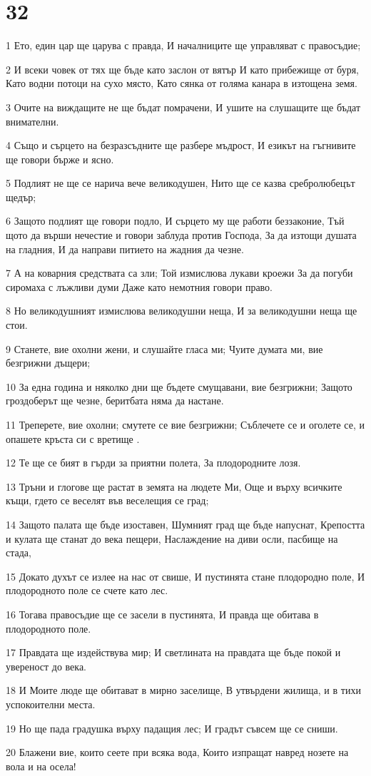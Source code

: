 \chapter{32}

\par 1 Ето, един цар ще царува с правда, И началниците ще управляват с правосъдие;
\par 2 И всеки човек от тях ще бъде като заслон от вятър И като прибежище от буря, Като водни потоци на сухо място, Като сянка от голяма канара в изтощена земя.
\par 3 Очите на виждащите не ще бъдат помрачени, И ушите на слушащите ще бъдат внимателни.
\par 4 Също и сърцето на безразсъдните ще разбере мъдрост, И езикът на гъгнивите ще говори бърже и ясно.
\par 5 Подлият не ще се нарича вече великодушен, Нито ще се казва сребролюбецът щедър;
\par 6 Защото подлият ще говори подло, И сърцето му ще работи беззаконие, Тъй щото да върши нечестие и говори заблуда против Господа, За да изтощи душата на гладния, И да направи питието на жадния да чезне.
\par 7 А на коварния средствата са зли; Той измислюва лукави кроежи За да погуби сиромаха с лъжливи думи Даже като немотния говори право.
\par 8 Но великодушният измислюва великодушни неща, И за великодушни неща ще стои.
\par 9 Станете, вие охолни жени, и слушайте гласа ми; Чуите думата ми, вие безгрижни дъщери;
\par 10 За една година и няколко дни ще бъдете смущавани, вие безгрижни; Защото гроздоберът ще чезне, беритбата няма да настане.
\par 11 Треперете, вие охолни; смутете се вие безгрижни; Съблечете се и оголете се, и опашете кръста си с вретище .
\par 12 Те ще се бият в гърди за приятни полета, За плодородните лозя.
\par 13 Тръни и глогове ще растат в земята на людете Ми, Още и върху всичките къщи, гдето се веселят във веселещия се град;
\par 14 Защото палата ще бъде изоставен, Шумният град ще бъде напуснат, Крепостта и кулата ще станат до века пещери, Наслаждение на диви осли, пасбище на стада,
\par 15 Докато духът се излее на нас от свише, И пустинята стане плодородно поле, И плодородното поле се счете като лес.
\par 16 Тогава правосъдие ще се засели в пустинята, И правда ще обитава в плодородното поле.
\par 17 Правдата ще издействува мир; И светлината на правдата ще бъде покой и увереност до века.
\par 18 И Моите люде ще обитават в мирно заселище, В утвърдени жилища, и в тихи успокоителни места.
\par 19 Но ще пада градушка върху падащия лес; И градът съвсем ще се сниши.
\par 20 Блажени вие, които сеете при всяка вода, Които изпращат навред нозете на вола и на осела!


